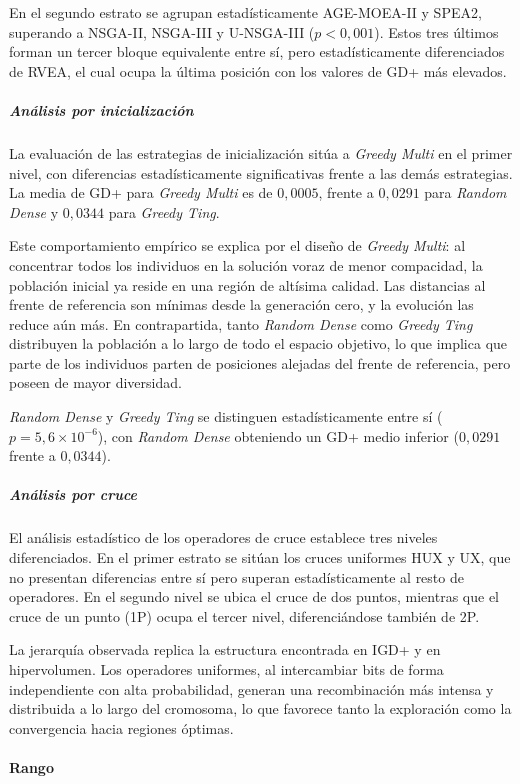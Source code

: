 En el segundo estrato se agrupan estadísticamente AGE-MOEA-II y SPEA2, superando a NSGA-II, NSGA-III y U-NSGA-III ($p < 0{,}001$). Estos tres últimos forman un tercer bloque equivalente entre sí, pero estadísticamente diferenciados de RVEA, el cual ocupa la última posición con los valores de GD+ más elevados.

\subparagraph{Análisis por inicialización}

La evaluación de las estrategias de inicialización sitúa a \textit{Greedy Multi} en el primer nivel, con diferencias estadísticamente significativas frente a las demás estrategias. La media de GD+ para \textit{Greedy Multi} es de $0{,}0005$, frente a $0{,}0291$ para \textit{Random Dense} y $0{,}0344$ para \textit{Greedy Ting}.

Este comportamiento empírico se explica por el diseño de \textit{Greedy Multi}: al concentrar todos los individuos en la solución voraz de menor compacidad, la población inicial ya reside en una región de altísima calidad. Las distancias al frente de referencia son mínimas desde la generación cero, y la evolución las reduce aún más. En contrapartida, tanto \textit{Random Dense} como \textit{Greedy Ting} distribuyen la población a lo largo de todo el espacio objetivo, lo que implica que parte de los individuos parten de posiciones alejadas del frente de referencia, pero poseen de mayor diversidad.

\textit{Random Dense} y \textit{Greedy Ting} se distinguen estadísticamente entre sí ($p = 5{,}6 \times 10^{-6}$), con \textit{Random Dense} obteniendo un GD+ medio inferior ($0{,}0291$ frente a $0{,}0344$).

\subparagraph{Análisis por cruce}

El análisis estadístico de los operadores de cruce establece tres niveles diferenciados. En el primer estrato se sitúan los cruces uniformes HUX y UX, que no presentan diferencias entre sí pero superan estadísticamente al resto de operadores. En el segundo nivel se ubica el cruce de dos puntos, mientras que el cruce de un punto (1P) ocupa el tercer nivel, diferenciándose también de 2P.

La jerarquía observada replica la estructura encontrada en IGD+ y en hipervolumen. Los operadores uniformes, al intercambiar bits de forma independiente con alta probabilidad, generan una recombinación más intensa y distribuida a lo largo del cromosoma, lo que favorece tanto la exploración como la convergencia hacia regiones óptimas.

\paragraph{Rango}


